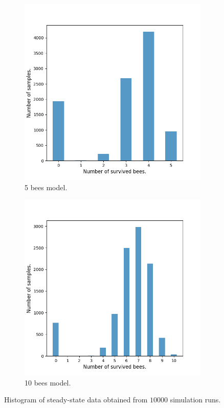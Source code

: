 \begin{figure}[H]
\begin{subfigure}{0.32\textwidth}
        \includegraphics[width=\linewidth]{figures/bee_5_data.png}
        \caption{5 bees model.}
    \end{subfigure}
    \hfill
    \begin{subfigure}{0.32\textwidth}
        \centering
        \includegraphics[width=\linewidth]{figures/bee_10_data.png}
        \caption{10 bees model.}
    \end{subfigure}
    \caption{Histogram of steady-state data obtained from $10000$ simulation runs.}
\end{figure}

